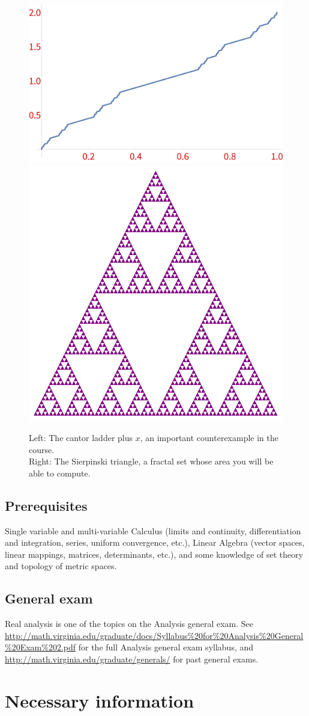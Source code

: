 \documentclass[oneside,11pt]{amsart}
\begin{document}
\begin{figure}[h]
	\includegraphics[height=.35\textwidth]{img/Cantor.pdf}
	\qquad 
	\includegraphics[height=.35\textwidth]{img/Sierp.pdf}
	\caption{Left: The cantor ladder plus $x$, an important counterexample in the course.\\
	Right: The Sierpinski triangle, a fractal set whose area you will be able to compute.}
\end{figure}

\subsection*{Prerequisites}

Single variable and multi-variable Calculus (limits and continuity,
differentiation and integration, series, uniform convergence, etc.), Linear
Algebra (vector spaces, linear mappings, matrices, determinants, etc.), and
some knowledge of set theory and topology of metric spaces.

\subsection*{General exam}
Real analysis is one of the topics on the Analysis general exam.
See \url{http://math.virginia.edu/graduate/docs/Syllabus%20for%20Analysis%20General%20Exam%202.pdf}
for the full Analysis general exam syllabus,
and \url{http://math.virginia.edu/graduate/generals/}
for past general exams.


\section{Necessary information}
\bigskip
\end{document}
